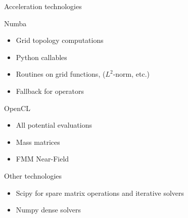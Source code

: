 \documentclass[dvipsnames,10pt]{beamer}
\begin{document}
\begin{frame}{Acceleration technologies}

\begin{minipage}{5cm}
\begin{small}
{\color{blue} Numba}
\begin{itemize}
    \item Grid topology computations
    \item Python callables
    \item Routines on grid functions, ($L^2$-norm, etc.)
    \item Fallback for operators
\end{itemize}
\end{small}
\end{minipage}
\begin{minipage}{5cm}
\begin{small}
{\color{blue} OpenCL}
\begin{itemize}
    \item All potential evaluations
    \item Mass matrices
    \item FMM Near-Field
\end{itemize}
\end{small}
\end{minipage}

\vspace{\baselineskip}

\begin{small}
{\color{blue} Other technologies }
\begin{itemize}
    \item Scipy for spare matrix operations and iterative solvers
    \item Numpy dense solvers
\end{itemize}
\end{small}

\end{frame}
\end{document}
